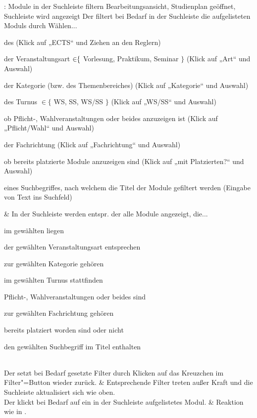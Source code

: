 \begin{usecase}{: Module in der Suchleiste filtern}
	{Bearbeitungsansicht, \gls{Studienplan} geöffnet, Suchleiste wird angezeigt}
	Der  filtert bei Bedarf in der Suchleiste die aufgelisteten \glspl{Modul} durch Wählen...
	\begin{tblitemize}
		\item des \opt{}  (Klick auf „ECTS“ und Ziehen an den Reglern)
		\item der Veranstaltungsart\opt{} $\in\hspace{-3pt}\{$ Vorlesung, Praktikum, Seminar $\}$ (Klick auf „Art“ und Auswahl)
		\item der Kategorie\opt{} (bzw. des Themenbereiches) (Klick auf „Kategorie“ und Auswahl)
		\item des Turnus\opt{} $\in \{$ WS, SS, WS/SS $\}$ (Klick auf „WS/SS“ und Auswahl)
		\item ob Pflicht-, Wahlveranstaltungen oder beides anzuzeigen ist\opt{} (Klick auf „Pflicht/Wahl“ und Auswahl)
		\item der Fachrichtung\opt{} (Klick auf „Fachrichtung“ und Auswahl)
		\item ob bereits platzierte Module anzuzeigen sind\opt{} (Klick auf „mit Platzierten?“ und Auswahl)
		\item eines Suchbegriffes, nach welchem die Titel der Module gefiltert werden (Eingabe von Text ins Suchfeld)
	\end{tblitemize}
	& In der Suchleiste werden entspr. der  alle Module angezeigt, die...
	\begin{tblitemize}
		\item im gewählten  liegen\opt
		\item der gewählten Veranstaltungsart entsprechen\opt
		\item zur gewählten Kategorie gehören\opt
		\item im gewählten Turnus stattfinden\opt
		\item Pflicht-, Wahlveranstaltungen oder beides sind\opt
		\item zur gewählten Fachrichtung gehören\opt
		\item bereits platziert worden sind oder nicht\opt
		\item den gewählten Suchbegriff im Titel enthalten
	\end{tblitemize} \\
	\hline
	Der  setzt bei Bedarf gesetzte Filter durch Klicken auf das Kreuzchen im Filter"=Button wieder zurück.
	& Entsprechende Filter treten außer Kraft und die Suchleiste aktualisiert sich wie oben. \\
	\hline
	Der  klickt bei Bedarf auf ein in der Suchleiste aufgelistetes Modul.
	& Reaktion wie in .
\end{usecase}

